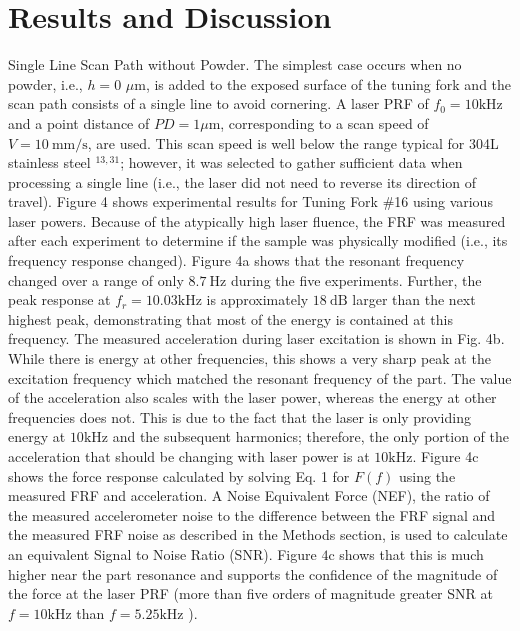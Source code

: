 \documentclass[10pt]{article}
\begin{document}
\section*{Results and Discussion}
Single Line Scan Path without Powder. The simplest case occurs when no powder, i.e., $h=0$ $\mu \mathrm{m}$, is added to the exposed surface of the tuning fork and the scan path consists of a single line to avoid cornering. A laser PRF of $f_{0}=10 \mathrm{kHz}$ and a point distance of $P D=1 \mu \mathrm{m}$, corresponding to a scan speed of $V=10 \mathrm{~mm} / \mathrm{s}$, are used. This scan speed is well below the range typical for 304L stainless steel ${ }^{13,31}$; however, it was selected to gather sufficient data when processing a single line (i.e., the laser did not need to reverse its direction of travel). Figure 4 shows experimental results for Tuning Fork \#16 using various laser powers. Because of the atypically high laser fluence, the FRF was measured after each experiment to determine if the sample was physically modified (i.e., its frequency response changed). Figure 4a shows that the resonant frequency changed over a range of only $8.7 \mathrm{~Hz}$ during the five experiments. Further, the peak response at $f_{r}=10.03 \mathrm{kHz}$ is approximately $18 \mathrm{~dB}$ larger than the next highest peak, demonstrating that most of the energy is contained at this frequency. The measured acceleration during laser excitation is shown in Fig. 4b. While there is energy at other frequencies, this shows a very sharp peak at the excitation frequency which matched the resonant frequency of the part. The value of the acceleration also scales with the laser power, whereas the energy at other frequencies does not. This is due to the fact that the laser is only providing energy at $10 \mathrm{kHz}$ and the subsequent harmonics; therefore, the only portion of the acceleration that should be changing with laser power is at $10 \mathrm{kHz}$. Figure 4c shows the force response calculated by solving Eq. 1 for $F(f)$ using the measured FRF and acceleration. A Noise Equivalent Force (NEF), the ratio of the measured accelerometer noise to the difference between the FRF signal and the measured FRF noise as described in the Methods section, is used to calculate an equivalent Signal to Noise Ratio (SNR). Figure $4 \mathrm{c}$ shows that this is much higher near the part resonance and supports the confidence of the magnitude of the force at the laser PRF (more than five orders of magnitude greater SNR at $f=10 \mathrm{kHz}$ than $f=5.25 \mathrm{kHz}$ ).
\end{document}
